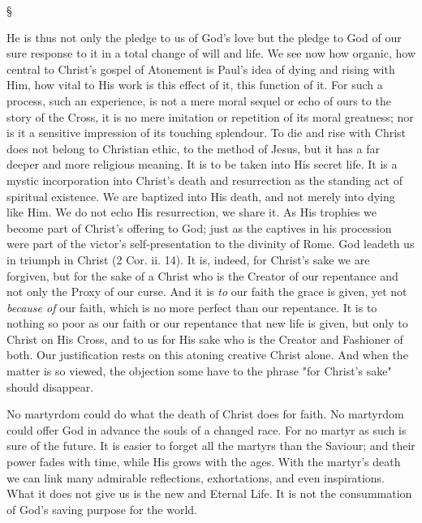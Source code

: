 \documentclass[12pt,a5paper,twoside,titlepage]{book}
\begin{document}
\begin{center}
\S
\end{center}

He is thus not only the pledge to us of God's 
love but the pledge to God of our sure response 
to it in a total change of will and life. We see 
now how organic, how central to Christ's gospel 
of Atonement is Paul's idea of dying and rising 
with Him, how vital to His work is this effect 
of it, this function of it. For such a process, 
such an experience, is not a mere moral sequel 
or echo of ours to the story of the Cross, it is 
no mere imitation or repetition of its moral 
greatness; nor is it a sensitive impression of 
its touching splendour. To die and rise with 
Christ does not belong to Christian ethic, to 
the method of Jesus, but it has a far deeper 
and more religious meaning. It is to be taken 
into His secret life. It is a mystic incorporation 
into Christ's death and resurrection as the 
standing act of spiritual existence. We are 
baptized into His death, and not merely into 
dying like Him. We do not echo His resurrection, 
we share it. As His trophies we become 
part of Christ's offering to God; just as the 
captives in his procession were part of the 
victor's self-presentation to the divinity of 
Rome. God leadeth us in triumph in Christ 
(2 Cor. ii. 14). It is, indeed, for Christ's sake 
we are forgiven, but for the sake of a Christ 
who is the Creator of our repentance and not 
only the Proxy of our curse. And it is \textit{to} our 
faith the grace is given, yet not \textit{because of} our 
faith, which is no more perfect than our repentance. 
It is to nothing so poor as our faith or 
our repentance that new life is given, but only 
to Christ on His Cross, and to us for His sake 
who is the Creator and Fashioner of both. Our 
justification rests on this atoning creative Christ 
alone. And when the matter is so viewed, the 
objection some have to the phrase "for Christ's 
sake" should disappear. 

No martyrdom could do what the death of 
Christ does for faith. No martyrdom could 
offer God in advance the souls of a changed 
race. For no martyr as such is sure of the 
future. It is easier to forget all the martyrs 
than the Saviour; and their power fades with 
time, while His grows with the ages. With the 
martyr's death we can link many admirable 
reflections, exhortations, and even inspirations. 
What it does not give us is the new and Eternal 
Life. It is not the consummation of God's saving 
purpose for the world. 
\end{document}
